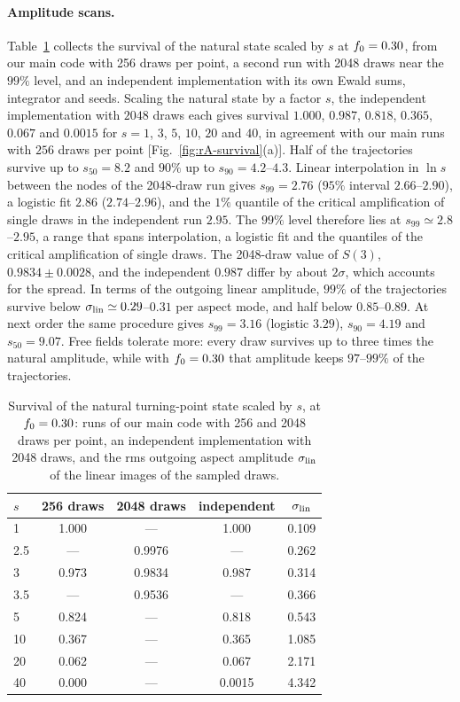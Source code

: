 \paragraph{Amplitude scans.}
Table~\ref{tab:rA-amp} collects the survival of the natural state scaled by $s$ at $f_0=0.30$, from our main code with 256 draws per point, a second run with 2048 draws near the $99\%$ level, and an independent implementation with its own Ewald sums, integrator and seeds. %
Scaling the natural state by a factor $s$, the independent implementation with $2048$ draws each gives survival $1.000$, $0.987$, $0.818$, $0.365$, $0.067$ and $0.0015$ for $s=1$, $3$, $5$, $10$, $20$ and $40$, in agreement with our main runs with $256$ draws per point [Fig.~\ref{fig:rA-survival}(a)]. %
Half of the trajectories survive up to $s_{50}=8.2$ and $90\%$ up to $s_{90}=4.2$--$4.3$. %
Linear interpolation in $\ln s$ between the nodes of the 2048-draw run gives $s_{99}=2.76$ ($95\%$ interval $2.66$--$2.90$), a logistic fit $2.86$ ($2.74$--$2.96$), and the $1\%$ quantile of the critical amplification of single draws in the independent run $2.95$. %
The $99\%$ level therefore lies at $s_{99}\simeq2.8$--$2.95$, a range that spans interpolation, a logistic fit and the quantiles of the critical amplification of single draws. %
The 2048-draw value of $S(3)$, $0.9834\pm0.0028$, and the independent $0.987$ differ by about $2\sigma$, which accounts for the spread. %
In terms of the outgoing linear amplitude, $99\%$ of the trajectories survive below $\sigma_{\rm lin}\simeq0.29$--$0.31$ per aspect mode, and half below $0.85$--$0.89$. %
At next order the same procedure gives $s_{99}=3.16$ (logistic $3.29$), $s_{90}=4.19$ and $s_{50}=9.07$. %
Free fields tolerate more: every draw survives up to three times the natural amplitude, while with $f_0=0.30$ that amplitude keeps $97$--$99\%$ of the trajectories. %

\begin{table}[tbp]
\centering
\caption{Survival of the natural turning-point state scaled by $s$, at $f_0=0.30$: runs of our main code with 256 and 2048 draws per point, an independent implementation with 2048 draws, and the rms outgoing aspect amplitude $\sigma_{\rm lin}$ of the linear images of the sampled draws.}
\label{tab:rA-amp}
\begin{tabular}{lcccc}
\toprule
$s$ & 256 draws & 2048 draws & independent & $\sigma_{\rm lin}$\\
\midrule
1 & 1.000 & --- & 1.000 & 0.109\\ %
2.5 & --- & 0.9976 & --- & 0.262\\ %
3 & 0.973 & 0.9834 & 0.987 & 0.314\\ %
3.5 & --- & 0.9536 & --- & 0.366\\ %
5 & 0.824 & --- & 0.818 & 0.543\\ %
10 & 0.367 & --- & 0.365 & 1.085\\ %
20 & 0.062 & --- & 0.067 & 2.171\\ %
40 & 0.000 & --- & 0.0015 & 4.342\\ %
\bottomrule
\end{tabular}
\end{table}

